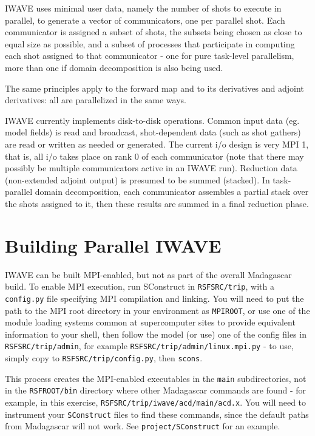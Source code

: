 IWAVE uses minimal user data, namely the number of shots to execute in parallel, to generate a vector of communicators, one per parallel shot. Each communicator is assigned a subset of shots, the subsets being chosen as close to equal size as possible, and a subset of processes that participate in computing each shot assigned to that communicator - one for pure task-level parallelism, more than one if domain decomposition is also being used.

The same principles apply to the forward map and to its derivatives and adjoint derivatives: all are parallelized in the same ways.

IWAVE currently implements disk-to-disk operations. Common input data (eg. model fields) is read and broadcast, shot-dependent data (such as shot gathers) are read or written as needed or generated. The current i/o design is very MPI 1, that is, all i/o takes place on rank 0 of each communicator (note that there may possibly be multiple communicators active in an IWAVE run). Reduction data (non-extended adjoint output) is presumed to be summed (stacked). In task-parallel domain decomposition, each communicator assembles a partial stack over the shots assigned to it, then these results are summed in a final reduction phase.

\section{Building Parallel IWAVE}
IWAVE can be built MPI-enabled, but not as part of the overall Madagascar build. To enable MPI execution, run SConstruct in {\tt RSFSRC/trip}, with a {\tt config.py} file specifying MPI compilation and linking. You will need to put the path to the MPI root directory in your environment as {\tt MPIROOT}, or use one of the module loading systems common at supercomputer sites to provide equivalent information to your shell, then follow the model (or use) one of the config files in {\tt RSFSRC/trip/admin}, for example {\tt RSFSRC/trip/admin/linux.mpi.py} - to use, simply copy to {\tt RSFSRC/trip/config.py}, then {\tt scons}.

This process creates the MPI-enabled executables in the {\tt main} subdirectories, not in the {\tt RSFROOT/bin} directory where other Madagascar commands are found - for example, in this exercise, {\tt RSFSRC/trip/iwave/acd/main/acd.x}. You will need to instrument your {\tt SConstruct} files to find these commands, since the default paths from Madagascar will not work. See {\tt project/SConstruct} for an example.

